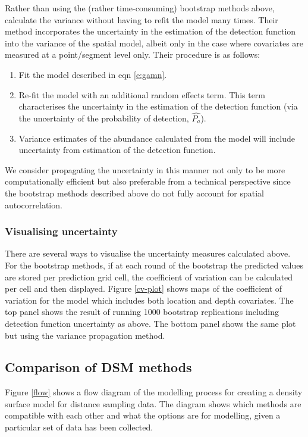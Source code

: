 \documentclass[a4paper,12pt]{article}
\begin{document}
Rather than using the (rather time-consuming) bootstrap methods above, \cite{WILLIAMS:2011in} calculate the variance without having to refit the model many times.  Their method incorporates the uncertainty in the estimation of the detection function into the variance of the spatial model, albeit only in the case where covariates are measured at a point/segment level only. Their procedure is as follows:
\begin{enumerate}
\item Fit the model described in eqn \ref{e:gamn}.
\item Re-fit the model with an additional random effects term. This term characterises the uncertainty in the estimation of the detection function (via the uncertainty of the probability of detection, $\hat{P_a}$).
\item Variance estimates of the abundance calculated from the model will include uncertainty from estimation of the detection function.
\end{enumerate}
We consider propagating the uncertainty in this manner not only to be more computationally efficient but also preferable from a technical perspective since the bootstrap methods described above do not fully account for spatial autocorrelation.

\subsubsection*{Visualising uncertainty}

There are several ways to visualise the uncertainty measures calculated above. For the bootstrap methods, if at each round of the bootstrap the predicted values are stored per prediction grid cell, the coefficient of variation can be calculated per cell and then displayed. Figure \ref{cv-plot} shows maps of the coefficient of variation for the model which includes both location and depth covariates. The top panel shows the result of running 1000 bootstrap replications including detection function uncertainty as above. The bottom panel shows the same plot but using the variance propagation method.


\subsection*{Comparison of DSM methods}

Figure \ref{flow} shows a flow diagram of the modelling process for creating a density surface model for distance sampling data. The diagram shows which methods are compatible with each other and what the options are for modelling, given a particular set of data has been collected.
\end{document}

